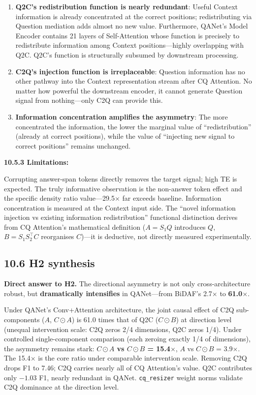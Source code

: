 \documentclass[10pt]{article}
\newcommand{\ReportSubsection}[1]{%
 \Needspace{24\baselineskip}%
 \phantomsection
 \subsection*{#1}%
 \addcontentsline{toc}{subsection}{#1}%
 \vspace{-0.12em}%
}
\newcommand{\FieldLabel}[1]{%
 {\bfseries #1:}\par
}
\begin{document}
\begin{enumerate}
\item \textbf{Q2C's redistribution function is nearly redundant}: Useful Context information is already concentrated at the correct positions; redistributing via Question mediation adds almost no new value. Furthermore, QANet's Model Encoder contains 21 layers of Self-Attention whose function is precisely to redistribute information among Context positions---highly overlapping with Q2C. Q2C's function is structurally subsumed by downstream processing.
\item \textbf{C2Q's injection function is irreplaceable}: Question information has no other pathway into the Context representation stream after CQ Attention. No matter how powerful the downstream encoder, it cannot generate Question signal from nothing---only C2Q can provide this.
\item \textbf{Information concentration amplifies the asymmetry}: The more concentrated the information, the lower the marginal value of ``redistribution'' (already at correct positions), while the value of ``injecting new signal to correct positions'' remains unchanged.
\end{enumerate}

\FieldLabel{10.5.3 Limitations}

Corrupting answer-span tokens directly removes the target signal; high TE is expected. The truly informative observation is the non-answer token effect and the specific density ratio value---29.5$\times$ far exceeds baseline. Information concentration is measured at the Context input side. The ``novel information injection vs existing information redistribution'' functional distinction derives from CQ Attention's mathematical definition ($A = S_1 Q$ introduces $Q$, $B = S_1 S_2^{\!\top} C$ reorganises $C$)---it is deductive, not directly measured experimentally.

\ReportSubsection{10.6 H2 synthesis}

\textbf{Direct answer to H2.} The directional asymmetry is not only cross-architecture robust, but \textbf{dramatically intensifies} in QANet---from BiDAF's 2.7$\times$ to \textbf{61.0$\times$}.

Under QANet's Conv+Attention architecture, the joint causal effect of C2Q sub-components ($A$, $C \odot A$) is 61.0 times that of Q2C ($C \odot B$) at direction level (unequal intervention scale: C2Q zeros 2/4 dimensions, Q2C zeros 1/4). Under controlled single-component comparison (each zeroing exactly 1/4 of dimensions), the asymmetry remains stark: \textbf{$C \odot A$ vs $C \odot B$ = 15.4$\times$}, $A$ vs $C \odot B$ = 3.9$\times$. The 15.4$\times$ is the core ratio under comparable intervention scale. Removing C2Q drops F1 to 7.46; C2Q carries nearly all of CQ Attention's value. Q2C contributes only $-1.03$ F1, nearly redundant in QANet. \texttt{cq\_resizer} weight norms validate C2Q dominance at the direction level.
\end{document}

